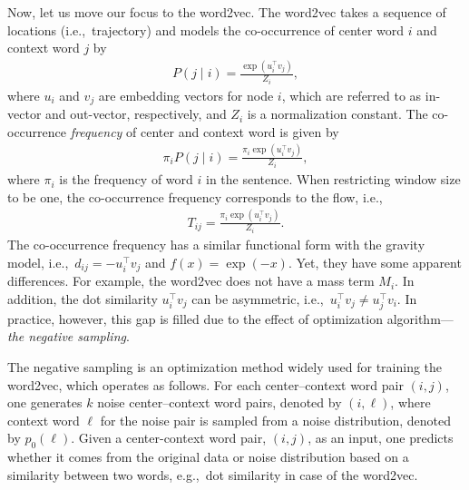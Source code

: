 \documentclass[12pt]{article} %
\def\given{\mid}
\def\eg{e.g.,~}
\def\ie{i.e.,~}
\begin{document}
Now, let us move our focus to the word2vec.
The word2vec takes a sequence of locations (\ie trajectory) and models the co-occurrence of center word $i$ and context word $j$ by
\begin{align}
    P(j\given i) = \frac{\exp(u_i ^\top v_j)}{Z_i},
\end{align}
where $u_i$ and $v_{j}$ are embedding vectors for node $i$, which are referred to as in-vector and out-vector, respectively, and $Z_i$ is a normalization constant.
The co-occurrence \emph{frequency} of center and context word is given by
\begin{align}
    \pi_i P(j\given i) = \frac{\pi_i\exp(u_i ^\top v_j)}{Z_i},
\end{align}
where $\pi_i$ is the frequency of word $i$ in the sentence.
When restricting window size to be one, the co-occurrence frequency corresponds to the flow, \ie
\begin{align}
    T_{ij} = \frac{\pi_i\exp(u_i ^\top v_j)}{Z_i}. \label{eq:flow_w2v}
\end{align}
The co-occurrence frequency has a similar functional form with the gravity model, \ie $d_{ij} = -u_i ^\top v_j$ and $f(x) = \exp(-x)$.
Yet, they have some apparent differences.
For example, the word2vec does not have a mass term $M_i$.
In addition, the dot similarity $u_i ^\top v_j$ can be asymmetric, \ie $u_i ^\top v_j \neq u_j ^\top v_i$.
In practice, however, this gap is filled due to the effect of optimization algorithm---\emph{the negative sampling}.

The negative sampling is an optimization method widely used for training the word2vec, which operates as follows.
For each center--context word pair $(i,j)$, one generates $k$ noise center--context word pairs, denoted by $(i, \ell)$, where context word $\ell$ for the noise pair is sampled from a noise distribution, denoted by $p_{0}(\ell)$.
Given a center-context word pair, $(i,j)$, as an input, one predicts whether it comes from the original data or noise distribution based on
a similarity between two words, \eg dot similarity in case of the word2vec.
\end{document}
